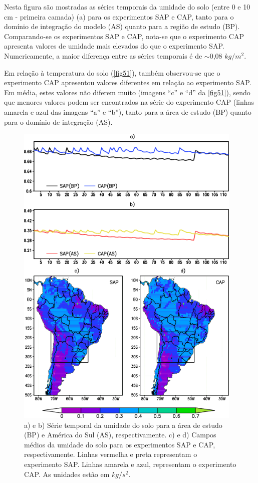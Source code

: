 Nesta figura são mostradas as séries temporais da umidade do solo (entre 0 e 10 cm - primeira camada) (a) para os experimentos SAP e CAP, tanto para o domínio de integração do modelo (AS) quanto para a região de estudo (BP). Comparando-se os experimentos SAP e CAP, nota-se que o experimento CAP apresenta valores de umidade mais elevados do que o experimento SAP. Numericamente, a maior diferença entre as séries temporais é de $\sim$0,08 $kg/m^{2}$.

Em relação à temperatura do solo (\autoref{fig51}), também observou-se que o experimento CAP apresentou valores diferentes em relação ao experimento SAP. Em média, estes valores não diferem muito (imagens ``c'' e ``d'' da \autoref{fig51}), sendo que menores valores podem ser encontrados na série do experimento CAP (linhas amarela e azul das imagens ``a'' e ``b''), tanto para a área de estudo (BP) quanto para o domínio de integração (AS).

\begin{figure}[!hbp]
\centering
\includegraphics[height=15cm]{./figs/serie_umidade_solo-ANL-new.png}
\caption{a) e b) Série temporal da umidade do solo para a área de estudo (BP) e América do Sul (AS), respectivamente. c) e d) Campos médios da umidade do solo para os experimentos SAP e CAP, respectivamente. Linhas vermelha e preta representam o experimento SAP. Linhas amarela e azul, representam o experimento CAP. As unidades estão em $kg/s^{2}$.}
\label{fig50}
\end{figure}

